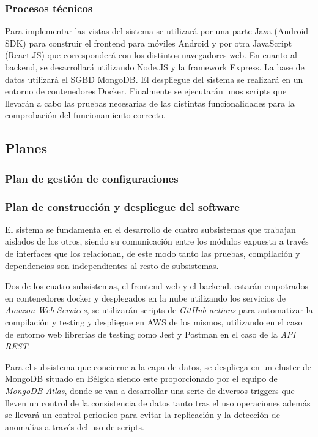 \documentclass{article}
\begin{document}
\subsubsection{Procesos técnicos}
Para implementar las vistas del sistema se utilizará por una parte Java (Android SDK) para construir el frontend para móviles Android y por otra JavaScript (React.JS) que corresponderá con los distintos navegadores web.
En cuanto al backend, se desarrollará utilizando Node.JS y la framework Express. La base de datos utilizará el SGBD MongoDB.
El despliegue del sistema se realizará en un entorno de contenedores Docker.
Finalmente se ejecutarán unos scripts que llevarán a cabo las pruebas necesarias de las distintas funcionalidades para la comprobación del funcionamiento correcto.
\subsection{Planes}

\subsubsection{Plan de gestión de configuraciones}

\subsubsection{Plan de construcción y despliegue del software}

El sistema se fundamenta en el desarrollo de cuatro subsistemas que trabajan aislados de los otros, siendo su comunicación entre los módulos expuesta a través de interfaces que los relacionan, de este modo tanto las pruebas, compilación y dependencias son independientes al resto de subsistemas. 

Dos de los cuatro subsistemas, el frontend web y el backend, estarán empotrados en contenedores docker y desplegados en la nube utilizando los servicios de \textit{Amazon Web Services}, se utilizarán scripts de \textit{GitHub actions} para automatizar la compilación y testing y despliegue en AWS de los mismos, utilizando en el caso de entorno web librerías de testing como Jest y Postman en el caso de la \textit{API REST}. 

Para el subsistema que concierne a la capa de datos, se despliega en un cluster de MongoDB situado en Bélgica siendo este proporcionado por el equipo de \textit{MongoDB Atlas}, donde se van a desarrollar una serie de diversos triggers que lleven un control de la consistencia de datos tanto tras el uso operaciones además se llevará un control periodico para evitar la replicación y la detección de anomalías a través del uso de scripts.
\end{document}
